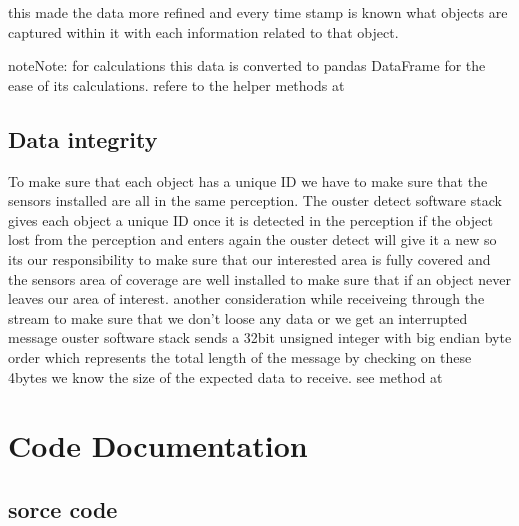 \documentclass[letterpaper,10pt,english]{sphinxmanual}
\begin{document}
\sphinxAtStartPar
this made the data more refined and every time stamp is known what objects are captured within it with each information related to that object.

\begin{sphinxadmonition}{note}{Note:}
\sphinxAtStartPar
for calculations this data is converted to pandas DataFrame for the ease of its calculations. refere to the helper methods at {\hyperref[\detokenize{processing:processing-utils-ref}]{}}
\end{sphinxadmonition}


\section{Data integrity}
\label{\detokenize{projectdoc:data-integrity}}
\sphinxAtStartPar
To make sure that each object has a unique ID we have to make sure that the sensors installed are all in the same perception.
The ouster detect software stack gives each object a unique ID  once it is detected in the perception if the object lost from the perception and enters again
the ouster detect will give it a new  so its our responsibility to make sure that our interested area is fully covered and the sensors area of coverage are well
installed to make sure that if an object never leaves our area of interest. another consideration while receiveing through the stream to make sure that we don’t loose any
data or we get an interrupted message ouster software stack sends a 32\sphinxhyphen{}bit unsigned integer with big endian byte order which represents the total length of the message
by checking on these 4\sphinxhyphen{}bytes we know the size of the expected data to receive. see  method at {\hyperref[\detokenize{processing:processing-data-ref}]{}}

\sphinxstepscope


\chapter{Code Documentation}
\label{\detokenize{codedoc:code-documentation}}\label{\detokenize{codedoc::doc}}

\section{sorce code}
\label{\detokenize{codedoc:sorce-code}}
\sphinxstepscope
\end{document}
